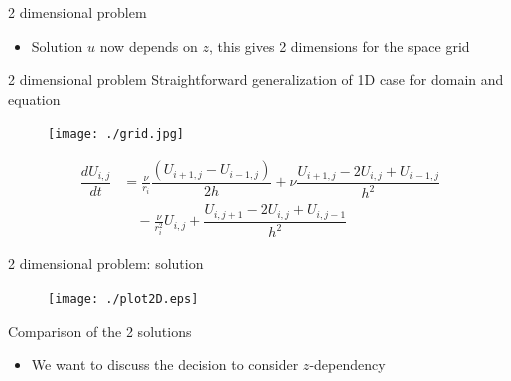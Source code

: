 \documentclass{beamer}
\begin{document}
\begin{frame}{2 dimensional problem}
\begin{itemize}
\item Solution $u$ now depends on $z$, this gives 2 dimensions for the space grid
\end{itemize}
\end{frame}

\begin{frame}{2 dimensional problem}
Straightforward generalization of 1D case for domain and equation

\begin{figure}[!h]
\centering
\texttt{[image: ./grid.jpg]}
\end{figure}
\begin{align*}
\dfrac{dU_{i,j}}{dt}&= \frac{\nu}{r_i}\dfrac{(U_{i+1,j}-U_{i-1,j})}{2h}+\nu\dfrac{U_{i+1,j}-2U_{i,j}+U_{i-1,j}}{h^2}\\ &\quad-\frac{\nu}{r_{i}^2}U_{i,j} 
+\dfrac{U_{i,j+1}-2U_{i,j}+U_{i,j-1}}{h^2} 
\end{align*}
\end{frame}

\begin{frame}{2 dimensional problem: solution}

\begin{figure}[!h]
\centering
\texttt{[image: ./plot2D.eps]}
\end{figure}

\end{frame}


\begin{frame}{Comparison of the 2 solutions}
\begin{itemize}
\item We want to discuss the decision to consider $z$-dependency
\end{itemize}

\begin{figure}[!h]
\centering
\end{figure}
\end{frame}
\end{document}

